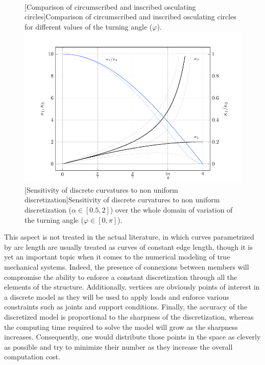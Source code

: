 \begin{figure}[!p]
	\captionsetup[subfloat]{captionskip=10pt}
	\centering
	\vspace{-5mm}
	\hspace{5mm}
	 \\[-10mm]
	\hspace{5mm}
	[Comparison of circumscribed and inscribed osculating circles]{Comparison of circumscribed and inscribed osculating circles for different values of the turning angle ($\varphi$).}
	\label{fig:kb_animation}
	\vspace{0mm}
	\includegraphics{ch3_geometry/plot/2_bench_kb/build.pdf}
	[Sensitivity of discrete curvatures to non uniform discretization]{Sensitivity of discrete curvatures to non uniform discretization ($\alpha \in [0.5,2]$) over the whole domain of variation of the turning angle ($\varphi \in [0,\pi]$).}
	\label{fig:kb_bench}
\end{figure}

This aspect is not treated in the actual literature, in which curves parametrized by arc length are usually treated as curves of constant edge length, though it is yet an important topic when it comes to the numerical modeling of true mechanical systems. Indeed, the presence of connexions between members will compromise the ability to enforce a constant discretization through all the elements of the structure. Additionally, vertices are obviously points of interest in a discrete model as they will be used to apply loads and enforce various constraints such as joints and support conditions. Finally, the accuracy of the discretized model is proportional to the sharpness of the discretization, whereas the computing time required to solve the model will grow as the sharpness increases. Consequently, one would distribute those points in the space as cleverly as possible and try to minimize their number as they increase the overall computation cost.

